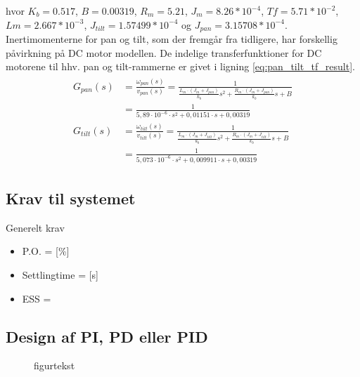 hvor 
\(K_b = 0.517\), \(B=0.00319\), \(R_m=5.21\), \(J_m=8.26*10^{-4}\), \(Tf=5.71*10^{-2}\), \(Lm=2.667*10^{-3}\), \(J_{tilt}=1.57499*10^{-4}\) og \(J_{pan}=3.15708*10^{-4}\).\\
Inertimomenterne for pan og tilt, som der fremgår fra tidligere, har forskellig påvirkning på DC motor modellen. De indelige transferfunktioner for DC motorene til hhv. pan og tilt-rammerne er givet i ligning \ref{eq:pan_tilt_tf_result}. 
\begin{align}
\begin{split}
G_{ pan }\left( s \right) &=\frac { \omega _{ pan }\left( s \right)  }{ v_{ pan }\left( s \right)  } =\frac { 1 }{ \frac { { L }_{ m }\cdot  \left( { J }_{ m }+{ J }_{ pan } \right) }{ { k }_{ b } } { s }^{ 2 }+\frac { { R }_{ m }\cdot  \left( { J }_{ m }+{ J }_{ pan } \right) }{ { k }_{ b } } s+B } 
\\
&=\frac { 1 }{ 5,89\cdot { 10 }^{ -6 }\cdot { s }^{ 2 }+0,01151\cdot s+0,00319 } 
\\
G_{ tilt }\left( s \right) &=\frac { \omega _{ tilt }\left( s \right)  }{ v_{ tilt }\left( s \right)  } =\frac { 1 }{ \frac { { L }_{ m }\cdot  \left( { J }_{ m }+{ J }_{ tilt } \right) }{ { k }_{ b } } { s }^{ 2 }+\frac { { R }_{ m }\cdot \left( { J }_{ m }+{ J }_{ tilt } \right) }{ { k }_{ b } } s+B } 
\\
&= \frac { 1 }{ 5,073\cdot { 10 }^{ -6 }\cdot { s }^{ 2 }+0,009911\cdot s+0,00319 } 
\label{eq:pan_tilt_tf_result}
\end{split}
\end{align}

\subsection{Krav til systemet}
Generelt krav
\begin{itemize}
\item P.O. = [\%]
\item Settlingtime = [s]
\item ESS = 
\end{itemize}


\subsection{Design af PI, PD eller PID}
\begin{figure}[!th]
\centering
\begin{tikzpicture}[auto, node distance=2.6cm,>=latex']

\end{tikzpicture}
\caption[tekst i indholdsfortegnelsen]{figurtekst}
\label{fig:}
\end{figure}

